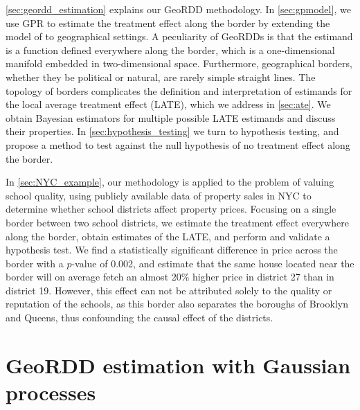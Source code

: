 \autoref{sec:geordd_estimation} explains our GeoRDD methodology.
In \autoref{sec:gpmodel}, we use GPR to estimate the treatment effect along the border by extending the model of \citet{Branson:2017qy} to geographical settings.
A peculiarity of GeoRDDs is that the estimand is a function defined everywhere along the border, which is a one-dimensional manifold embedded in two-dimensional space.
Furthermore, geographical borders, whether they be political or natural, are rarely simple straight lines.
The topology of borders complicates the definition and interpretation of estimands for the local average treatment effect (LATE), which we address in \autoref{sec:ate}.
We obtain Bayesian estimators for multiple possible LATE estimands and discuss their properties.
In \autoref{sec:hypothesis_testing} we turn to hypothesis testing, and propose a method to test against the null hypothesis of no treatment effect along the border.

In \autoref{sec:NYC_example}, our methodology is applied to the problem of valuing school quality, 
using publicly available data of property sales in NYC to determine whether school districts affect property prices.
Focusing on a single border between two school districts, we estimate the treatment effect everywhere along the border, obtain estimates of the LATE, and perform and validate a hypothesis test.
We find a statistically significant difference in price across the border with a \(p\)-value of 0.002, and estimate that the same house located near the border will on average fetch an almost 20\% higher price in district 27 than in district 19.
However, this effect can not be attributed solely to the quality or reputation of the schools, as this border also separates the boroughs of Brooklyn and Queens, thus confounding the causal effect of the districts.



\section{GeoRDD estimation with Gaussian processes}
\label{sec:geordd_estimation}

